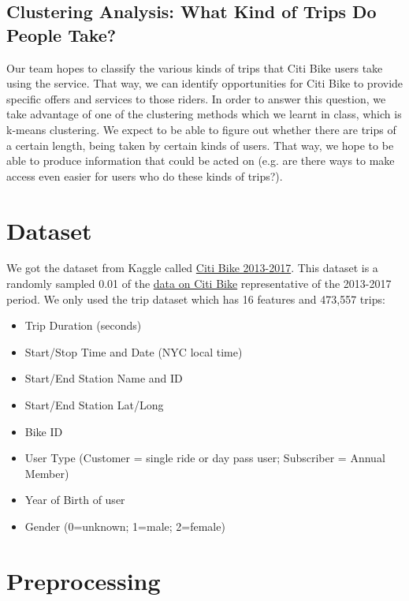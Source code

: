 \documentclass{article}
\begin{document}
\subsection{Clustering Analysis: What Kind of Trips Do People Take?}
Our team hopes to classify the various kinds of trips that Citi Bike users take using the service. That way, we can identify opportunities for Citi Bike to provide specific offers and services to those riders. In order to answer this question, we take advantage of one of the clustering methods which we learnt in class, which is k-means clustering. We expect to be able to figure out whether there are trips of a certain length, being taken by certain kinds of users. That way, we hope to be able to produce information that could be acted on (e.g. are there ways to make access even easier for users who do these kinds of trips?). 

\section{Dataset}
We got the dataset from Kaggle called \href{https://www.kaggle.com/datasets/fatihb/citibike-sampled-data-2013-2017?resource=download}{Citi Bike 2013-2017}. This dataset is a randomly sampled 0.01 of the \href{https://citibikenyc.com/system-data}{data on Citi Bike} representative of the 2013-2017 period. We only used the trip dataset which has 16 features and 473,557 trips:
\begin{itemize}
    \item Trip Duration (seconds)
    \item Start/Stop Time and Date (NYC local time)
    \item Start/End Station Name and ID
    \item Start/End Station Lat/Long
    \item Bike ID
    \item User Type (Customer = single ride or day pass user; Subscriber = Annual Member)
    \item Year of Birth of user
    \item Gender (0=unknown; 1=male; 2=female)
\end{itemize}

\section{Preprocessing}
\end{document}
